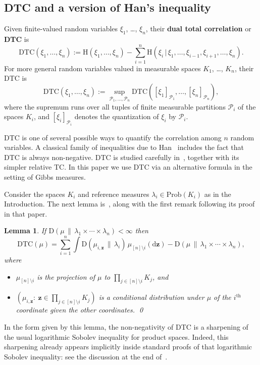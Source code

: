 \documentclass[aop,preprint]{imsart}
\newtheorem{lem}[thm]{Lemma}
\theoremstyle{remark}
\renewcommand{\bf}[1]{\boldsymbol{#1}}
\renewcommand{\rm}[1]{\mathrm{#1}}
\newcommand{\rmH}{\mathrm{H}}
\renewcommand{\d}{\mathrm{d}}
\renewcommand{\P}{\mathcal{P}}
\renewcommand{\l}{\lambda}
\renewcommand{\Pr}{\rm{Prob}}
\newcommand{\DTC}{\mathrm{DTC}}
\newcommand{\rmD}{\mathrm{D}}
\begin{document}
\subsection{DTC and a version of Han's inequality}\label{subs:Han}

Given finite-valued random variables $\xi_1$, \dots, $\xi_n$, their \textbf{dual total correlation} or \textbf{DTC} is
\[\DTC(\xi_1,\dots,\xi_n):= \rmH(\xi_1,\dots,\xi_n) - \sum_{i=1}^n \rmH(\xi_i\,|\,\xi_1,\dots,\xi_{i-1},\xi_{i+1},\dots,\xi_n).\]
For more general random variables valued in measurable spaces $K_1$, \dots, $K_n$, their DTC is
\[\DTC(\xi_1,\dots,\xi_n) := \sup_{\P_1,\dots,\P_n}\DTC([\xi_1]_{\P_1},\dots,[\xi_n]_{\P_n}),\]
where the supremum runs over all tuples of finite measurable partitions $\P_i$ of the spaces $K_i$, and $[\xi_i]_{\P_i}$ denotes the quantization of $\xi_i$ by $\P_i$.

DTC is one of several possible ways to quantify the correlation among $n$ random variables.  A classical family of inequalities due to Han~\cite[Theorem 4.1]{Han78} includes the fact that DTC is always non-negative.  DTC is studied carefully in~\cite{Aus--TC+DTC}, together with its simpler relative TC.  In this paper we use DTC via an alternative formula in the setting of Gibbs measures.

Consider the spaces $K_i$ and reference measures $\l_i \in \Pr(K_i)$ as in the Introduction. The next lemma is~\cite[Proposition 6.1, part (b)]{Aus--TC+DTC}, along with the first remark following its proof in that paper.

\begin{lem}\label{lem:DTC-and-Han}
If $\rmD(\mu\,\|\,\l_1\times \cdots \times \l_n) < \infty$ then
\[\DTC(\mu) = \sum_{i=1}^n \int \rmD(\mu_{i,\bf{z}}\,\|\,\l_i)\,\mu_{[n]\setminus i}(\d \bf{z}) - \rmD(\mu\,\|\,\l_1\times \cdots \times \l_n),\]
where
\begin{itemize}
	\item $\mu_{[n]\setminus i}$ is the projection of $\mu$ to $\prod_{j \in [n]\setminus i}K_j$, and
	\item $(\mu_{i,\bf{z}}:\ \bf{z} \in \prod_{j \in [n]\setminus i}K_j)$ is a conditional distribution under $\mu$ of the $i^{\rm{th}}$ coordinate given the other coordinates. \qed
\end{itemize}
\end{lem}

In the form given by this lemma, the non-negativity of DTC is a sharpening of the usual logarithmic Sobolev inequality for product spaces.  Indeed, this sharpening already appears implicitly inside standard proofs of that logarithmic Sobolev inequality: see the discussion at the end of~\cite[Section 6]{Aus--TC+DTC}.
\end{document}
